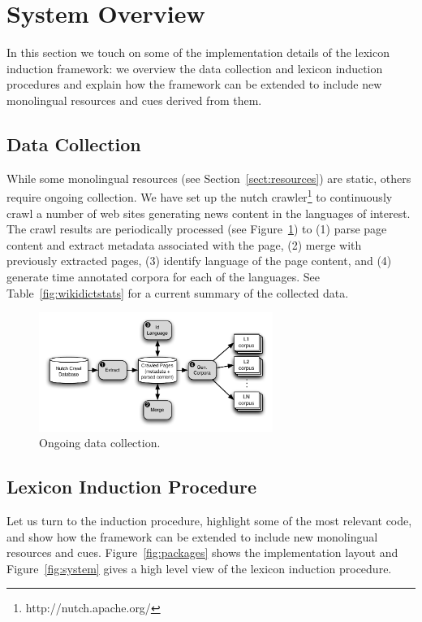 \documentclass{article}
\newcommand{\secref}[1]{Section~\ref{#1}}
\newcommand{\tabref}[1]{Table~\ref{#1}}
\newcommand{\figref}[1]{Figure~\ref{#1}}
\begin{document}
\section{System Overview}

In this section we touch on some of the implementation details of the lexicon induction framework: we overview the data collection and lexicon induction procedures and explain how the framework can be extended to include new monolingual resources and cues derived from them.  

\subsection{Data Collection}

While some monolingual resources (see \secref{sect:resources}) are static, others require ongoing collection.  We have set up the nutch crawler\footnote{http://nutch.apache.org/} to continuously crawl a number of web sites generating news content in the languages of interest.  The crawl results are periodically processed (see \figref{fig:data}) to (1) parse page content and extract metadata associated with the page, (2) merge with previously extracted pages, (3) identify language of the page content, and (4) generate time annotated corpora for each of the languages.  See \tabref{fig:wikidictstats} for a current summary of the collected data.

\begin{figure}[h]
\centerline{\mbox{\includegraphics[width=3in]{figures/datacollect}}}
\caption{Ongoing data collection.}
\label{fig:data}
\end{figure}

\subsection{Lexicon Induction Procedure}

Let us turn to the induction procedure, highlight some of the most relevant code, and show how the framework can be extended to include new monolingual resources and cues.  \figref{fig:packages} shows the implementation layout and \figref{fig:system} gives a high level view of the lexicon induction procedure.\\
\end{document}
